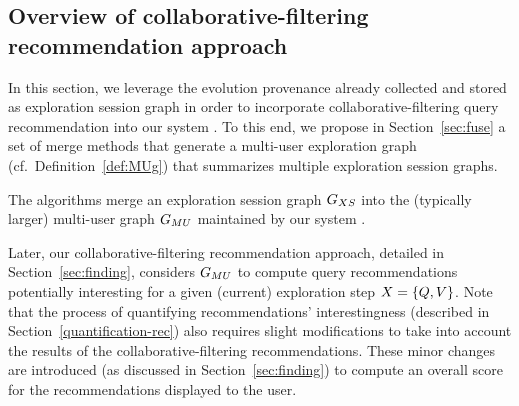 \subsection{Overview of collaborative-filtering recommendation approach}
\label{sec:overview}

In this section, we leverage the evolution provenance already collected and stored as exploration session graph in order to incorporate collaborative-filtering query recommendation into our system \prototype{}. 
To this end, we propose in Section~\ref{sec:fuse}  a set of merge methods that generate a multi-user exploration graph (cf.~Definition~\ref{def:MUg}) that summarizes multiple exploration session graphs. 





The algorithms merge an exploration session graph $G_{XS}{}$ into the (typically larger) multi-user graph $G_{MU}{}$ maintained by our system \prototype{}. 


Later, our collaborative-filtering recommendation approach, detailed in Section~\ref{sec:finding}, considers $G_{MU}{}$ to compute query recommendations potentially interesting for a given (current) exploration step $X=\{Q,V\}$. 
Note that the process of quantifying recommendations' interestingness (described in Section~\ref{quantification-rec}) also requires slight modifications to take into account the results of the collaborative-filtering recommendations. 
These minor changes are introduced (as discussed in Section~\ref{sec:finding}) to compute an overall score for the recommendations displayed to the user.







